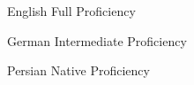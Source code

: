 
\begin{cvskills}

  \cvskill
    {English} %
    {Full Proficiency} %

  \cvskill
    {German} %
    {Intermediate Proficiency} %

  \cvskill
    {Persian} %
    {Native Proficiency} %
\end{cvskills}
